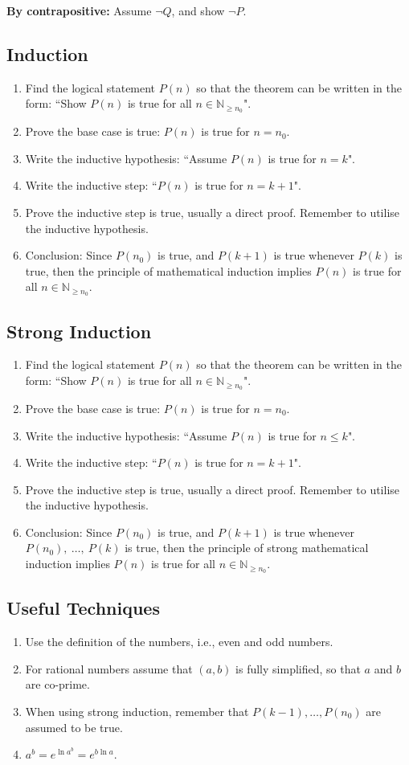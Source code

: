 \documentclass{article}
\theoremstyle{plain}
\numberwithin{theorem}{section}
\theoremstyle{definition}
\numberwithin{definition}{section}
\newcommand*{\N}{\mathbb{N}}
\begin{document}
\noindent\textbf{By contrapositive:} Assume $\neg{Q}$, and show $\neg{P}$.
%
\subsection{Induction}
\begin{enumerate}
    \item Find the logical statement $P(n)$ so that the theorem can be written in the form: ``Show $P(n)$ is true for all $n \in \N_{\geq n_0}$".
    \item Prove the base case is true: $P(n)$ is true for $n=n_0$.
    \item Write the inductive hypothesis: ``Assume $P(n)$ is true for $n=k$".
    \item Write the inductive step: ``$P(n)$ is true for $n=k+1$".
    \item Prove the inductive step is true, usually a direct proof. Remember to utilise the inductive hypothesis.
    \item Conclusion: Since $P(n_0)$ is true, and $P(k+1)$ is true whenever $P(k)$ is true, then the principle of mathematical induction implies $P(n)$ is true for all $n\in \N_{\geq n_0}$.
\end{enumerate}
%
\subsection{Strong Induction}
\begin{enumerate}
    \item Find the logical statement $P(n)$ so that the theorem can be written in the form: ``Show $P(n)$ is true for all $n \in \N_{\geq n_0}$".
    \item Prove the base case is true: $P(n)$ is true for $n=n_0$.
    \item Write the inductive hypothesis: ``Assume $P(n)$ is true for $n\leq k$".
    \item Write the inductive step: ``$P(n)$ is true for $n=k+1$".
    \item Prove the inductive step is true, usually a direct proof. Remember to utilise the inductive hypothesis.
    \item Conclusion: Since $P(n_0)$ is true, and $P(k+1)$ is true whenever $P(n_0),\: \ldots,\: P(k)$ is true, then the principle of strong mathematical induction implies $P(n)$ is true for all $n\in \N_{\geq n_0}$.
\end{enumerate}
%
\subsection{Useful Techniques}
\begin{enumerate}
    \item Use the definition of the numbers, i.e., even and odd numbers.
    \item For rational numbers assume that $(a,b)$ is fully simplified, so that $a$ and $b$ are co-prime.
    \item When using strong induction, remember that $P(k-1), \ldots, P(n_0)$ are assumed to be true.
    \item $a^b=e^{\ln{a^b}}=e^{b\ln{a}}$.
\end{enumerate}
%
\end{document}
